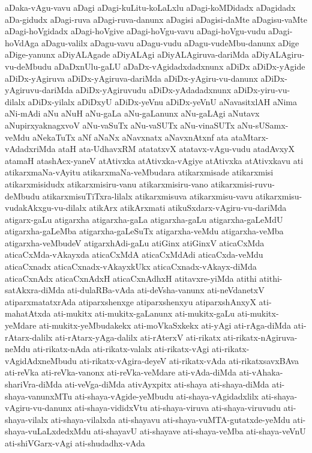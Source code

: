 {aDaka-vAgu-vavu
aDagi
aDagi-kuLitu-koLaLxlu
aDagi-koMDidadx
aDagidadx
aDa-gidudx
aDagi-ruva
aDagi-ruva-danunx
aDagisi
aDagisi-daMte
aDagisu-vaMte
aDagi-hoVgidadx
aDagi-hoVgive
aDagi-hoVgu-vavu
aDagi-hoVgu-vudu
aDagi-hoVdAga
aDagu-valilx
aDagu-vavu
aDagu-vudu
aDagu-vudeMbu-danunx
aDige
aDige-yanunx
aDiyALAgade
aDiyALAgi
aDiyALAgiruva-dariMda
aDiyALAgiru-vu-deMbudu
aDaDxnUlu-gaLU
aDaDx-vAgidadxdadxnunx
aDiDx
aDiDx-yAgide
aDiDx-yAgiruva
aDiDx-yAgiruva-dariMda
aDiDx-yAgiru-vu-danunx
aDiDx-yAgiruvu-dariMda
aDiDx-yAgiruvudu
aDiDx-yAdadadxnunx
aDiDx-yiru-vu-dilalx
aDiDx-yilalx
aDiDxyU
aDiDx-yeVnu
aDiDx-yeVnU
aNavasitxlAH
aNima
aNi-mAdi
aNu
aNuH
aNu-gaLa
aNu-gaLanunx
aNu-gaLAgi
aNutavx
aNupirxyaknagxvoV
aNu-vaSuTx
aNu-vaSUTx
aNu-vinaSUTx
aNu-sUSamx-veMdu
aNekaTuTx
aNf
aNaNx
aNavxnatx
aNavxnAtxnf
ata
ataMtarx-vAdadxriMda
ataH
ata-UdhavxRM
atatatxvX
atatavx-vAgu-vudu
atadAvxyX
atamaH
atashAcx-yaneV
atAtivxka
atAtivxka-vAgiye
atAtivxka
atAtivxkavu
ati
atikarxmaNa-vAyitu
atikarxmaNa-veMbudara
atikarxmisade
atikarxmisi
atikarxmisidudx
atikarxmisiru-vanu
atikarxmisiru-vano
atikarxmisi-ruvu-deMbudu
atikarxmisuTiTxra-lilalx
atikarxmisuva
atikarxmisu-vavu
atikarxmisu-vudakAkxgu-vu-dilalx
atikArx
atikArxmati
atikuSxdarx-vAgiru-vu-dariMda
atigarx-gaLu
atigarxha
atigarxha-gaLa
atigarxha-gaLu
atigarxha-gaLeMdU
atigarxha-gaLeMba
atigarxha-gaLeSuTx
atigarxha-veMdu
atigarxha-veMba
atigarxha-veMbudeV
atigarxhAdi-gaLu
atiGinx
atiGinxV
aticaCxMda
aticaCxMda-vAkayxda
aticaCxMdA
aticaCxMdAdi
aticaCxda-veMdu
aticaCxnadx
aticaCxnadx-vAkayxkUkx
aticaCxnadx-vAkayx-diMda
aticaCxnAdx
aticaCxnAdxH
aticaCxnAdhxH
atitavxre-yiMda
atithi
atithi-satAkxra-diMda
ati-dulaRBa-vAda
ati-deVsha-vanunx
ati-neVdanetxV
atiparxmatatxrAda
atiparxshenxge
atiparxshenxyu
atiparxshAnxyX
ati-mahatAtxda
ati-mukitx
ati-mukitx-gaLanunx
ati-mukitx-gaLu
ati-mukitx-yeMdare
ati-mukitx-yeMbudakekx
ati-moVkaSxkekx
ati-yAgi
ati-rAga-diMda
ati-rAtarx-dalilx
ati-rAtarx-yAga-dalilx
ati-rAterxV
ati-rikatx
ati-rikatx-nAgiruva-neMdu
ati-rikatx-nAda
ati-rikatx-valalx
ati-rikatx-vAgi
ati-rikatx-vAgidAdxneMbudu
ati-rikatx-vAgira-deyeV
ati-rikatx-vAda
ati-rikatxsavxBAva
ati-reVka
ati-reVka-vanonx
ati-reVka-veMdare
ati-vAda-diMda
ati-vAhaka-shariVra-diMda
ati-veVga-diMda
ativAyxpitx
ati-shaya
ati-shaya-diMda
ati-shaya-vanunxMTu
ati-shaya-vAgide-yeMbudu
ati-shaya-vAgidadxlilx
ati-shaya-vAgiru-vu-danunx
ati-shaya-vididxVtu
ati-shaya-viruva
ati-shaya-viruvudu
ati-shaya-vilalx
ati-shaya-vilalxda
ati-shayavu
ati-shaya-vuMTA-gutatxde-yeMdu
ati-shaya-vuLaLxdedxMdu
ati-shayavU
ati-shayave
ati-shaya-veMba
ati-shaya-veVnU
ati-shiVGarx-vAgi
ati-shudadhx-vAda
}
